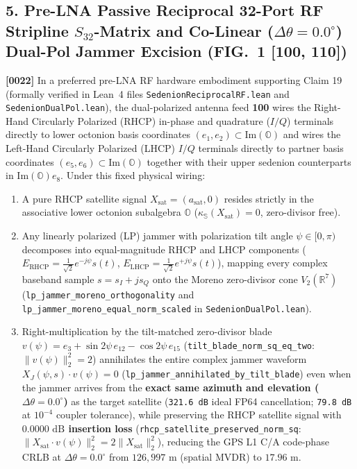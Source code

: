 \documentclass[12pt,letterpaper]{article}
\begin{document}
\subsection*{5. Pre-LNA Passive Reciprocal 32-Port RF Stripline $S_{32}$-Matrix and Co-Linear ($\Delta\theta = 0.0^\circ$) Dual-Pol Jammer Excision (FIG.\ 1 [100, 110])}
\textbf{[0022]} In a preferred pre-LNA RF hardware embodiment supporting Claim 19 (formally verified in Lean~4 files \texttt{SedenionReciprocalRF.lean} and \texttt{SedenionDualPol.lean}), the dual-polarized antenna feed \textbf{100} wires the Right-Hand Circularly Polarized (RHCP) in-phase and quadrature ($I/Q$) terminals directly to lower octonion basis coordinates $(e_1, e_2) \subset \mathrm{Im}(\mathbb{O})$ and wires the Left-Hand Circularly Polarized (LHCP) $I/Q$ terminals directly to partner basis coordinates $(e_5, e_6) \subset \mathrm{Im}(\mathbb{O})$ together with their upper sedenion counterparts in $\mathrm{Im}(\mathbb{O})e_8$. Under this fixed physical wiring:
\begin{enumerate}[leftmargin=18pt,itemsep=1pt]
    \item A pure RHCP satellite signal $X_{\mathrm{sat}} = (a_{\mathrm{sat}}, 0)$ resides strictly in the associative lower octonion subalgebra $\mathbb{O}$ ($\kappa_{\mathbb{S}}(X_{\mathrm{sat}}) = 0$, zero-divisor free).
    \item Any linearly polarized (LP) jammer with polarization tilt angle $\psi \in [0, \pi)$ decomposes into equal-magnitude RHCP and LHCP components ($E_{\mathrm{RHCP}} = \frac{1}{\sqrt{2}}e^{-j\psi}s(t)$, $E_{\mathrm{LHCP}} = \frac{1}{\sqrt{2}}e^{+j\psi}s(t)$), mapping every complex baseband sample $s = s_I + j s_Q$ onto the Moreno zero-divisor cone $V_2(\mathbb{R}^7)$ (\texttt{lp\_jammer\_moreno\_orthogonality} and \texttt{lp\_jammer\_moreno\_equal\_norm\_scaled} in \texttt{SedenionDualPol.lean}).
    \item Right-multiplication by the tilt-matched zero-divisor blade $v(\psi) = e_3 + \sin 2\psi\,e_{12} - \cos 2\psi\,e_{15}$ (\texttt{tilt\_blade\_norm\_sq\_eq\_two}: $\|v(\psi)\|_2^2 = 2$) annihilates the entire complex jammer waveform $X_J(\psi, s) \cdot v(\psi) = 0$ (\texttt{lp\_jammer\_annihilated\_by\_tilt\_blade}) even when the jammer arrives from the \textbf{exact same azimuth and elevation ($\Delta\theta = 0.0^\circ$)} as the target satellite (\texttt{321.6 dB} ideal FP64 cancellation; \texttt{79.8 dB} at $10^{-4}$ coupler tolerance), while preserving the RHCP satellite signal with \textbf{$0.0000\text{ dB}$ insertion loss} (\texttt{rhcp\_satellite\_preserved\_norm\_sq}: $\|X_{\mathrm{sat}}\cdot v(\psi)\|_2^2 = 2\|X_{\mathrm{sat}}\|_2^2$), reducing the GPS L1 C/A code-phase CRLB at $\Delta\theta = 0.0^\circ$ from $126{,}997\text{ m}$ (spatial MVDR) to $17.96\text{ m}$.
\end{enumerate}
\end{document}
